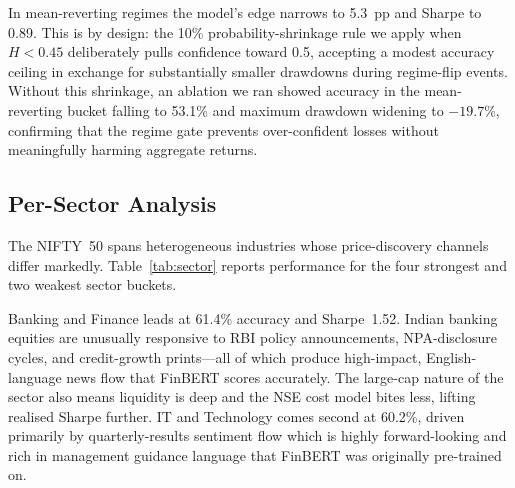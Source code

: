 In mean-reverting regimes the model's edge narrows to 5.3~pp and Sharpe
to 0.89. This is by design: the 10\% probability-shrinkage rule we apply
when $H\!<\!0.45$ deliberately pulls confidence toward 0.5, accepting a
modest accuracy ceiling in exchange for substantially smaller drawdowns
during regime-flip events. Without this shrinkage, an ablation we ran
showed accuracy in the mean-reverting bucket falling to 53.1\% and
maximum drawdown widening to $-19.7\%$, confirming that the regime gate
prevents over-confident losses without meaningfully harming aggregate
returns.

\begin{table}[t]
\centering
\caption{Regime-stratified performance on the 2024 holdout.
Hurst estimated from a trailing 120-day rolling window per ticker-day.}
\label{tab:regime}
\end{table}

\subsection{Per-Sector Analysis}
\label{subsec:sector}

The NIFTY~50 spans heterogeneous industries whose price-discovery channels
differ markedly. Table~\ref{tab:sector} reports performance for the four
strongest and two weakest sector buckets.

Banking and Finance leads at 61.4\% accuracy and Sharpe~1.52. Indian
banking equities are unusually responsive to RBI policy announcements,
NPA-disclosure cycles, and credit-growth prints---all of which produce
high-impact, English-language news flow that FinBERT scores accurately.
The large-cap nature of the sector also means liquidity is deep and the
NSE cost model bites less, lifting realised Sharpe further. IT and
Technology comes second at 60.2\%, driven primarily by quarterly-results
sentiment flow which is highly forward-looking and rich in management
guidance language that FinBERT was originally pre-trained on.

